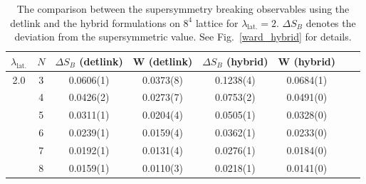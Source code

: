

\begin{table}
\begin{center}  
\begin{tabular}{cccccccl} 
\hline\hline
$\lambda_{\text{lat.}}$ & $N$ & $\Delta S_{B}$ (detlink) & W (detlink) & $\Delta S_{B}$ (hybrid) & W (hybrid) \\
 \hline 
2.0 & 3 & 0.0606(1)  & 0.0373(8) & 0.1238(4)   & 0.0684(1) \\
& 4 & 0.0426(2)  & 0.0273(7) & 0.0753(2) &  0.0491(0)  \\
& 5 &  0.0311(1) & 0.0204(4)  & 0.0505(1)   & 0.0328(0)  \\
& 6 & 0.0239(1)  & 0.0159(4) &  0.0362(1)  & 0.0233(0)  \\
& 7 & 0.0192(1)  & 0.0131(4) &  0.0276(1)  & 0.0184(0)   \\
& 8 &  0.0159(1) & 0.0110(3) & 0.0218(1)  & 0.0141(0)  \\
\hline  \hline
\end{tabular}
\end{center}
\caption{
\label{tab:ward-hybrid} 
The comparison between the supersymmetry breaking observables using the detlink and the hybrid formulations
on $8^4$ lattice for $\lambda_{\text{lat.}}=2$. $\Delta S_{B}$ denotes the deviation from the supersymmetric value. See Fig.~\ref{ward_hybrid} for details.} 
\end{table}


